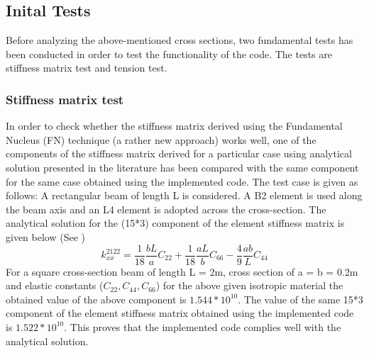 \documentclass[a4paper,12pt]{article}
\begin{document}
\subsection*{Inital Tests}
\indent\indent\indent\indent Before analyzing the above-mentioned cross sections, two fundamental tests has been conducted in order to test the functionality of the code. The tests are stiffness matrix test and tension test.

\subsubsection*{Stiffness matrix test}
\indent\indent\indent\indent In order to check whether the stiffness matrix derived using the Fundamental Nucleus (FN) technique (a rather new approach) works well, one of the components of the stiffness matrix derived for a particular case using analytical solution presented in the literature has been compared with the same component for the same case obtained using the implemented code. The test case is given as follows: A rectangular beam of length L is considered. A B2 element is used along the beam axis and an L4 element is adopted across the cross-section. The analytical solution for the (15*3) component of the element stiffness matrix is given below (See \cite{carrera2014finite})
\begin{equation}
k^{2122}_{xx} = \frac{1}{18} \frac{b L}{a} C_{22} + \frac{1}{18} \frac{a L}{b} C_{66} - \frac{4}{9} \frac{a b}{L} C_{44}
\end{equation}
For a square cross-section beam of length L = 2m, cross section of a = b = 0.2m and elastic constants ($C_{22},C_{44},C_{66}$) for the above given isotropic material the obtained value of the above component is $1.544*10^{10}$. The value of the same 15*3 component of the element stiffness matrix obtained using the implemented code is $1.522*10^{10}$. This proves that the implemented code complies well with the analytical solution.
\end{document}
